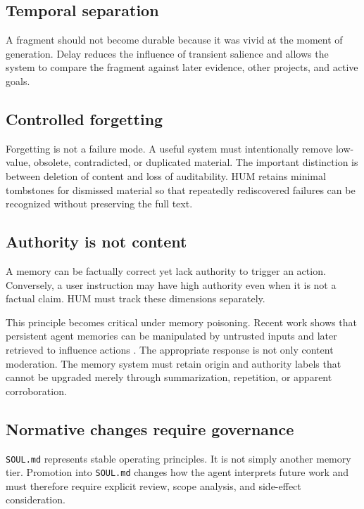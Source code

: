 \documentclass[11pt,a4paper]{article}
\begin{document}
\subsection{Temporal separation}

A fragment should not become durable because it was vivid at the moment of generation. Delay reduces the influence of transient salience and allows the system to compare the fragment against later evidence, other projects, and active goals.

\subsection{Controlled forgetting}

Forgetting is not a failure mode. A useful system must intentionally remove low-value, obsolete, contradicted, or duplicated material. The important distinction is between deletion of content and loss of auditability. HUM retains minimal tombstones for dismissed material so that repeatedly rediscovered failures can be recognized without preserving the full text.

\subsection{Authority is not content}

A memory can be factually correct yet lack authority to trigger an action. Conversely, a user instruction may have high authority even when it is not a factual claim. HUM must track these dimensions separately.

This principle becomes critical under memory poisoning. Recent work shows that persistent agent memories can be manipulated by untrusted inputs and later retrieved to influence actions \cite{sunil2026,dash2026,pulipaka2026}. The appropriate response is not only content moderation. The memory system must retain origin and authority labels that cannot be upgraded merely through summarization, repetition, or apparent corroboration.

\subsection{Normative changes require governance}

\texttt{SOUL.md} represents stable operating principles. It is not simply another memory tier. Promotion into \texttt{SOUL.md} changes how the agent interprets future work and must therefore require explicit review, scope analysis, and side-effect consideration.
\end{document}
